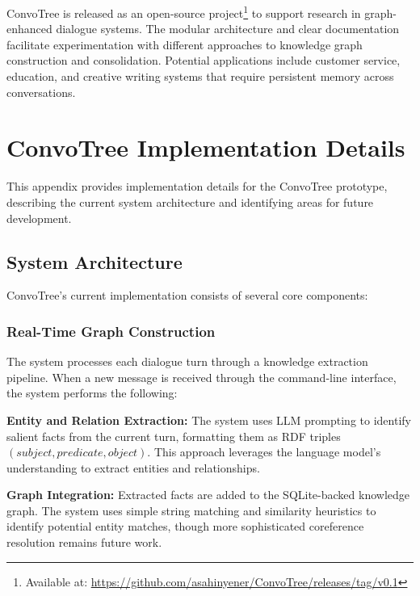 \documentclass[11pt]{article}
\begin{document}
ConvoTree is released as an open-source project\footnote{Available at: \url{https://github.com/asahinyener/ConvoTree/releases/tag/v0.1}} to support research in graph-enhanced dialogue systems. The modular architecture and clear documentation facilitate experimentation with different approaches to knowledge graph construction and consolidation. Potential applications include customer service, education, and creative writing systems that require persistent memory across conversations.


%


\appendix

\section{ConvoTree Implementation Details}
\label{appendix:convotree}

This appendix provides implementation details for the ConvoTree prototype, describing the current system architecture and identifying areas for future development.

\subsection{System Architecture}

ConvoTree's current implementation consists of several core components:

\subsubsection{Real-Time Graph Construction}
The system processes each dialogue turn through a knowledge extraction pipeline. When a new message is received through the command-line interface, the system performs the following:

\textbf{Entity and Relation Extraction:} The system uses LLM prompting to identify salient facts from the current turn, formatting them as RDF triples $(subject, predicate, object)$. This approach leverages the language model's understanding to extract entities and relationships.

\textbf{Graph Integration:} Extracted facts are added to the SQLite-backed knowledge graph. The system uses simple string matching and similarity heuristics to identify potential entity matches, though more sophisticated coreference resolution remains future work.
\end{document}
